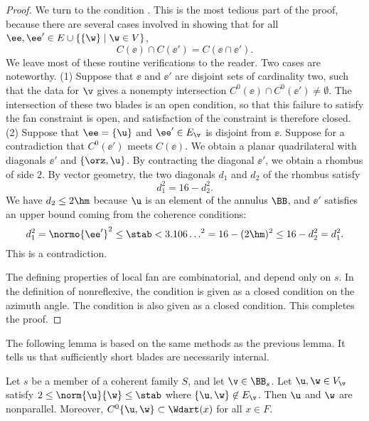 \begin{proof}
We turn to the condition .  This is the most tedious part 
of the proof, because there are several cases involved in showing that 
for all $\ee ,\ee '\in E \cup \{\{\w\}\mid \w\in V\}$, 
\[ C(\ee )\cap C(\ee ') = C(\ee \cap \ee ').\] We leave most of these
routine verifications to the reader.  Two cases are noteworthy.  (1)
Suppose that $\ee$ and $\ee'$ are disjoint sets of cardinality two,
such that the data for $\v$ gives a nonempty intersection
$C^0(\ee)\cap C^0(\ee')\ne\emptyset$.  The intersection of these two
blades is an open condition, so that this failure to satisfy the fan
constraint is open, and satisfaction of the constraint is therefore
closed.  (2) Suppose that $\ee=\{\u\}$ and $\ee'\in E_\v$ is disjoint
from $\ee$.  Suppose for a contradiction that $C^0(\ee')$ meets
$C(\ee)$.  We obtain a planar quadrilateral with diagonals $\ee'$ and
$\{\orz,\u\}$.  By contracting the diagonal $\ee'$, we obtain a
rhombus of side $2$.  By vector geometry, the two diagonals $d_1$ and
$d_2$ of the rhombus satisfy
\begin{equation}\label{eqn:rhombus16}
d_1^2 = 16 - d_2^2.
\end{equation}
We have $d_2\le 2\hm$ because  $\u$ is an element of the annulus $\BB$,
 and $\ee'$ satisfies an upper bound coming from the
coherence conditions:
\begin{equation}\label{eqn:rhombus}
d_1^2 = \normo{\ee'}^2\le \stab< 3.106\ldots^2 = 
16-(2\hm)^2 \le 16-d_2^2 = d_1^2.
\end{equation}
This is a contradiction. 

The defining properties of local fan are combinatorial, and depend only on 
$s$.
In the definition of nonreflexive, the condition  is given
as a closed condition on the azimuth angle.  The condition
 is also given as a closed condition.
This completes the proof.
\end{proof}

The following lemma is based on the same methods as the previous
lemma.  It tells us that sufficiently short blades are necessarily
internal.

\begin{lemma}[]\label{lemma:2hm-slice}
Let $s$ be a member of a coherent family $S$, and let $\v\in \BB_s$.
Let $\u,\w\in V_\v$ satisfy $2\le\norm{\u}{\w}\le \stab$ where
$\{\u,\w\}\not\in E_\v$.  Then $\u$ and $\w$ are nonparallel.
Moreover,
$C^0\{\u,\w\}\subset \Wdart(x)$ for all $x\in F$.
\end{lemma}

